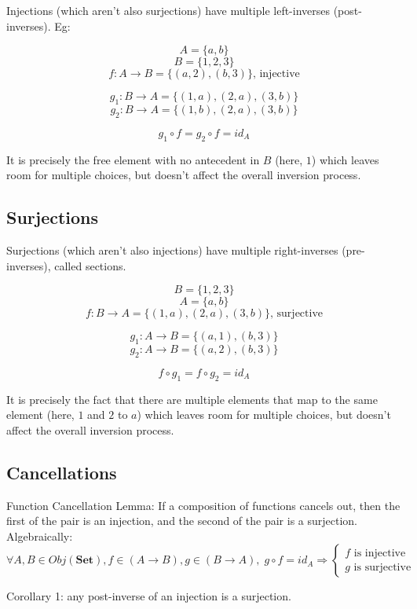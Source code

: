 \documentclass[12pt, letterpaper, twoside]{report}
\begin{document}
Injections (which aren't also surjections) have multiple left-inverses (post-inverses). Eg:

$$A = \{ a, b    \}$$
$$B = \{ 1, 2, 3 \}$$
$$f : A \to B = \{ (a, 2), (b, 3) \} \text{, injective}$$

$$g_1 : B \to A = \{ (1, a), (2, a), (3, b) \}$$
$$g_2 : B \to A = \{ (1, b), (2, a), (3, b) \}$$

$$g_1 \circ f = g_2 \circ f = id_A$$

It is precisely the free element with no antecedent in $B$ (here, $1$) which leaves room for multiple choices, but doesn't affect the overall inversion process.


\subsection*{Surjections}

Surjections (which aren't also injections) have multiple right-inverses (pre-inverses), called sections.



$$B = \{ 1, 2, 3 \}$$
$$A = \{ a, b    \}$$
$$f : B \to A = \{ (1, a), (2, a), (3, b) \} \text{, surjective}$$

$$g_1 : A \to B = \{(a, 1), (b, 3) \}$$
$$g_2 : A \to B = \{(a, 2), (b, 3) \}$$

$$f \circ g_1 = f \circ g_2 = id_A$$

It is precisely the fact that there are multiple elements that map to the same element (here, $1$ and $2$ to $a$) which leaves room for multiple choices, but doesn't affect the overall inversion process.



\subsection*{Cancellations}

Function Cancellation Lemma: If a composition of functions cancels out, then the first of the pair is an injection, and the second of the pair is a surjection. Algebraically:
$$
\forall A, B \in Obj(\textbf{Set}),
f \in (A \to B), g \in (B \to A), \;
	g \circ f = id_A
\Rightarrow
	\begin{cases}
		f \text{ is injective} \\
		g \text{ is surjective}
	\end{cases}
$$

Corollary 1: any post-inverse of an injection is a surjection.
\end{document}
